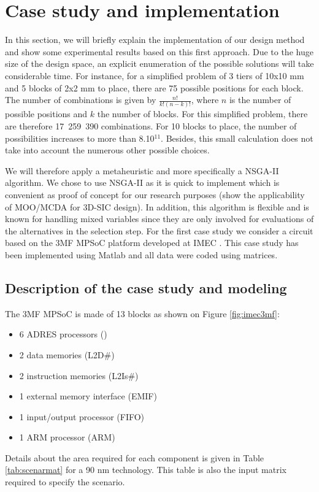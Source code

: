 \section{Case study and implementation}
\label{sec:casestudy}
In this section, we will briefly explain the implementation of our design method and show some experimental results based on this first approach. Due to the huge size of the design space, an explicit enumeration of the possible solutions will take considerable time. For instance, for a simplified problem of 3 tiers of 10x10 mm and 5 blocks of 2x2 mm to place, there are 75 possible positions for each block. The number of combinations is given by $\frac{n!}{k!(n-k)!}$, where $n$ is the number of possible positions and $k$ the number of blocks. For this simplified problem, there are therefore 17~259~390 combinations. For 10 blocks to place, the number of possibilities increases to more than 8.10$^{11}$. Besides, this small calculation does not take into account the numerous other possible choices.

We will therefore apply a metaheuristic and more specifically a NSGA-II algorithm. We chose to use NSGA-II as it is quick to implement which is convenient as proof of concept for our research purposes (show the applicability of MOO/MCDA for 3D-SIC design). In addition, this algorithm is flexible and is known for handling mixed variables since they are only involved for evaluations of the alternatives in the selection step. For the first case study we consider a circuit based on the 3MF MPSoC platform developed at IMEC \cite{dmilojev08b}. This case study has been implemented using Matlab and all data were coded using matrices.

\subsection{Description of the case study and modeling}
The 3MF MPSoC is made of 13 blocks as shown on Figure \ref{fig:imec3mf}:
\begin{itemize}
\item 6 ADRES processors (\cite{conf/fpl/VeredasSMM05})
\item 2 data memories (L2D\#)
\item 2 instruction memories (L2Is\#)
\item 1 external memory interface (EMIF)
\item 1 input/output processor (FIFO)
\item 1 ARM processor (ARM)
\end{itemize}
Details about the area required for each component is given in Table \ref{tab:scenarmat} for a 90 nm technology. This table is also the input matrix required to specify the scenario.

